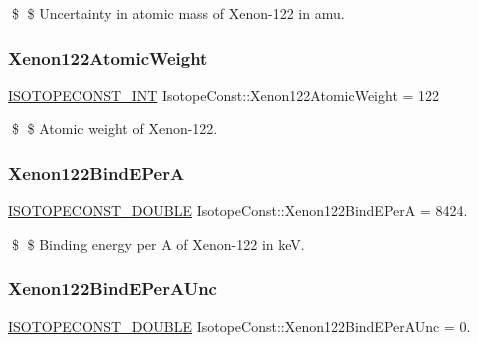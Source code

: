 \$ \$ Uncertainty in atomic mass of Xenon-\/122 in amu. \mbox{\label{group___isotope_const-_xenon-_xe122_ga6d685594ebdb15dac9991408bb4ec1a7}} 
\subsubsection{\texorpdfstring{Xenon122\+Atomic\+Weight}{Xenon122AtomicWeight}}
{\footnotesize\ttfamily \mbox{\hyperlink{group___isotope_const-_macros_ga5f18360b3e99483a35c32d789e62621c}{I\+S\+O\+T\+O\+P\+E\+C\+O\+N\+S\+T\+\_\+\+I\+NT}} Isotope\+Const\+::\+Xenon122\+Atomic\+Weight = 122}

\$ \$ Atomic weight of Xenon-\/122. \mbox{\label{group___isotope_const-_xenon-_xe122_ga9b6ac4055fdade6b6fb7506778738097}} 
\subsubsection{\texorpdfstring{Xenon122\+Bind\+E\+PerA}{Xenon122BindEPerA}}
{\footnotesize\ttfamily \mbox{\hyperlink{group___isotope_const-_macros_ga8f45a7272ce02c0b4c65c44636ed719a}{I\+S\+O\+T\+O\+P\+E\+C\+O\+N\+S\+T\+\_\+\+D\+O\+U\+B\+LE}} Isotope\+Const\+::\+Xenon122\+Bind\+E\+PerA = 8424.}

\$ \$ Binding energy per A of Xenon-\/122 in keV. \mbox{\label{group___isotope_const-_xenon-_xe122_ga26acb7954b8302f8f713009949109597}} 
\subsubsection{\texorpdfstring{Xenon122\+Bind\+E\+Per\+A\+Unc}{Xenon122BindEPerAUnc}}
{\footnotesize\ttfamily \mbox{\hyperlink{group___isotope_const-_macros_ga8f45a7272ce02c0b4c65c44636ed719a}{I\+S\+O\+T\+O\+P\+E\+C\+O\+N\+S\+T\+\_\+\+D\+O\+U\+B\+LE}} Isotope\+Const\+::\+Xenon122\+Bind\+E\+Per\+A\+Unc = 0.}

